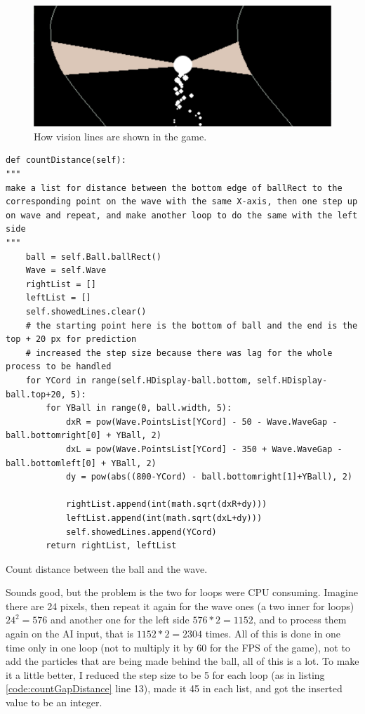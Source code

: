 \begin{figure}[H]
	\centering
	\includegraphics[width=0.7\linewidth]{"usedImages/vision 576 lines"}
	\caption{How vision lines are shown in the game.}
	\label{fig:vision576Lines}
\end{figure}

\begin{listing}[H]
	\begin{verbatim}
def countDistance(self):
"""
make a list for distance between the bottom edge of ballRect to the corresponding point on the wave with the same X-axis, then one step up on wave and repeat, and make another loop to do the same with the left side
"""
	ball = self.Ball.ballRect()
	Wave = self.Wave
	rightList = []
	leftList = []
	self.showedLines.clear()
	# the starting point here is the bottom of ball and the end is the top + 20 px for prediction
	# increased the step size because there was lag for the whole process to be handled
	for YCord in range(self.HDisplay-ball.bottom, self.HDisplay-ball.top+20, 5):
		for YBall in range(0, ball.width, 5):
			dxR = pow(Wave.PointsList[YCord] - 50 - Wave.WaveGap - ball.bottomright[0] + YBall, 2)
			dxL = pow(Wave.PointsList[YCord] - 350 + Wave.WaveGap - ball.bottomleft[0] + YBall, 2)
			dy = pow(abs((800-YCord) - ball.bottomright[1]+YBall), 2)

			rightList.append(int(math.sqrt(dxR+dy)))
			leftList.append(int(math.sqrt(dxL+dy)))
			self.showedLines.append(YCord)
		return rightList, leftList
	\end{verbatim}
\caption{Count distance between the ball and the wave.}
\label{code:countGapDistance}
\end{listing}

Sounds good, but the problem is the two for loops were CPU consuming. Imagine there are 24 pixels, then repeat it again for the wave ones (a two inner for loops) $24^2 = 576$ and another one for the left side $576*2 = 1152$, and to process them again on the AI input, that is $1152*2 = 2304$ times. All of this is done in one time only in one  loop (not to multiply it by 60 for the FPS of the game), not to add the particles that are being made behind the ball, all of this is a lot. To make it a little better, I reduced the step size to be 5 for each loop (as in listing \ref{code:countGapDistance} line 13), made it 45 in each list, and got the inserted value to be an integer.

